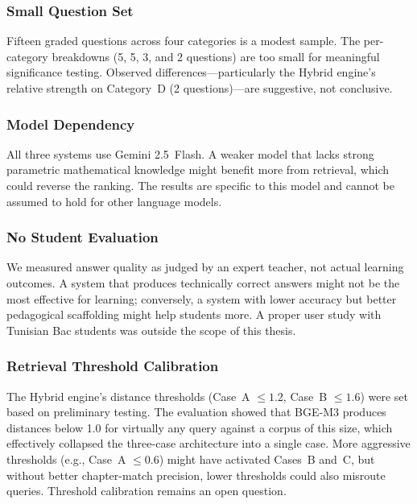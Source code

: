 \subsubsection{Small Question Set}

Fifteen graded questions across four categories is a modest sample. The
per-category breakdowns (5, 5, 3, and 2 questions) are too small for
meaningful significance testing. Observed differences—particularly the
Hybrid engine's relative strength on Category~D (2 questions)—are
suggestive, not conclusive.

\subsubsection{Model Dependency}

All three systems use Gemini 2.5~Flash. A weaker model that lacks strong
parametric mathematical knowledge might benefit more from retrieval, which
could reverse the ranking. The results are specific to this model and
cannot be assumed to hold for other language models.

\subsubsection{No Student Evaluation}

We measured answer quality as judged by an expert teacher, not actual
learning outcomes. A system that produces technically correct answers might
not be the most effective for learning; conversely, a system with lower
accuracy but better pedagogical scaffolding might help students more. A
proper user study with Tunisian Bac students was outside the scope of this
thesis.

\subsubsection{Retrieval Threshold Calibration}

The Hybrid engine's distance thresholds (Case~A $\leq 1.2$, Case~B
$\leq 1.6$) were set based on preliminary testing. The evaluation showed
that BGE-M3 produces distances below 1.0 for virtually any query against a
corpus of this size, which effectively collapsed the three-case architecture
into a single case. More aggressive thresholds (e.g., Case~A $\leq 0.6$)
might have activated Cases~B and~C, but without better chapter-match
precision, lower thresholds could also misroute queries. Threshold
calibration remains an open question.

